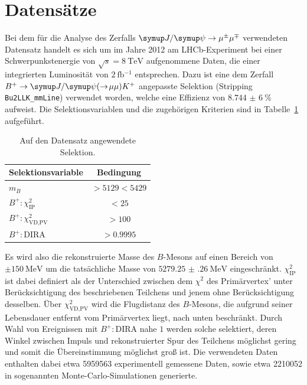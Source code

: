 \section{Datensätze}
%
Bei dem für die Analyse des Zerfalls $\kontroll$ verwendeten Datensatz handelt es sich um im Jahre 2012 am LHCb-Experiment bei einer Schwerpunkstenergie von $\sqrt{s}=\SI{8}{\tera\electronvolt}$ aufgenommene Daten, die einer integrierten Luminosität von $\SI{2}{\femto\barn^{-1}}$ entsprechen. Dazu ist eine dem Zerfall $B^{+}\rightarrow\jpsi(\rightarrow\!\mu\mu) K^{+}$ angepasste Selektion (Stripping \texttt{Bu2LLK\_mmLine}) verwendet worden, welche eine Effizienz von $\SI{8,744(6)}{\percent}$ aufweist. Die Selektionsvariablen und die zugehörigen Kriterien sind in Tabelle~\ref{tab:bstrip} aufgeführt.
%
\begin{table}[htb]
  \centering
  \caption{Auf den Datensatz angewendete Selektion.}
  \begin{tabular}{lc}
    \toprule
    Selektionsvariable                & Bedingung      \\
    \midrule
    $m_{B}$                           & $>\num{5129}<\num{5429}$  \\
    $B^{+}:\chi_{\text{IP}}^2$        & $<\num{25}$  \\
    $B^{+}:\chi_{\text{VD,PV}}^2$     & $>\num{100}$  \\
    $B^{+}:\text{DIRA}$               & $>\num{0.9995}$  \\
    \bottomrule
  \end{tabular}
  \label{tab:bstrip}
\end{table}
%
Es wird also die rekonstruierte Masse des $B$-Mesons auf einen Bereich von $\pm\SI{150}{\mega\electronvolt}$ um die tatsächliche Masse von $\SI{5279.25(26)}{\mega\electronvolt}$ eingeschränkt. $\chi_{\text{IP}}^2$ ist dabei definiert als der Unterschied zwischen dem $\chi^2$ des Primärvertex' unter Berücksichtigung des beschriebenen Teilchens und jenem ohne Berücksichtigung desselben. Über $\chi_{\text{VD,PV}}^2$ wird die Flugdistanz des $B$-Mesons, die aufgrund seiner Lebensdauer entfernt vom Primärvertex liegt, nach unten beschränkt. Durch Wahl von Ereignissen mit $B^{+}:\text{DIRA}$ nahe $1$ werden solche selektiert, deren Winkel zwischen Impuls und rekonstruierter Spur des Teilchens möglichst gering und somit die Übereinstimmung möglichst groß ist.
Die verwendeten Daten enthalten dabei etwa 5959563 experimentell gemessene Daten, sowie etwa 2210052 in sogenannten Monte-Carlo-Simulationen generierte.\\

